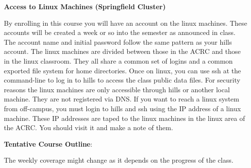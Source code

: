 \documentclass[11pt]{article}
\begin{document}
\hspace{3mm}

\textbf{Access to Linux Machines (Springfield Cluster)}

\hspace{3mm}

By enrolling in this course you will have an account on the linux machines.
These accounts will be created a week or so into the semester as announced in
class. The account name and initial password follow the same pattern as your
hills account. The linux machines are divided between those in the ACRC and
those in the linux classroom. They all share a common set of logins and a
common exported file system for home directories. Once on linux, you can use
ssh at the command-line to log in to hills to access the class public data
files.  For security reasons the linux machines are only accessible through
hills or another local machine. They are not registered via DNS. If you want to
reach a linux system from off-campus, you must login to hills and ssh using the
IP address of a linux machine. These IP addresses are taped to the linux
machines in the linux area of the ACRC. You should visit it and make a note of
them.


\hspace{3mm}

\textbf {\large Tentative Course Outline}:

The weekly coverage might change as it depends on the progress of the class.
\end{document}
